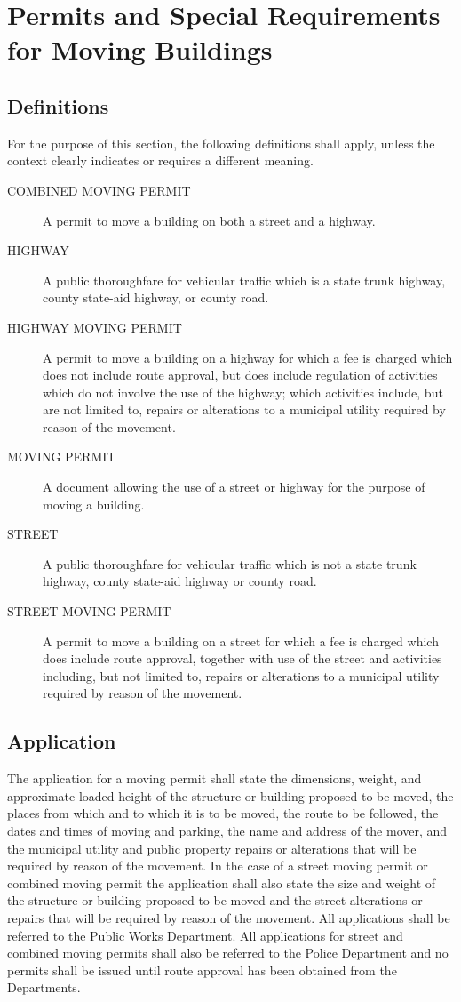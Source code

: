\section{Permits and Special Requirements for Moving Buildings}
\subsection{Definitions}
For the purpose of this section, the following definitions shall apply, unless the context clearly indicates or requires a different meaning.
\begin{description}
    \item[COMBINED MOVING PERMIT] A permit to move a building on both a street and a highway.
    \item[HIGHWAY] A public thoroughfare for vehicular traffic which is a state trunk highway, county state-aid highway, or county road.
    \item[HIGHWAY MOVING PERMIT] A permit to move a building on a highway for which a fee is charged which does not include route approval, but does include regulation of activities which do not involve the use of the highway; which activities include, but are not limited to, repairs or alterations to a municipal utility required by reason of the movement.
    \item[MOVING PERMIT] A document allowing the use of a street or highway for the purpose of moving a building.
    \item[STREET] A public thoroughfare for vehicular traffic which is not a state trunk highway, county state-aid highway or county road.
    \item[STREET MOVING PERMIT] A permit to move a building on a street for which a fee is charged which does include route approval, together with use of the street and activities including, but not limited to, repairs or alterations to a municipal utility required by reason of the movement.
\end{description}
\subsection{Application}
The application for a moving permit shall state the dimensions, weight, and approximate loaded height of the structure or building proposed to be moved, the places from which and to which it is to be moved, the route to be followed, the dates and times of moving and parking, the name and address of the mover, and the municipal utility and public property repairs or alterations that will be required by reason of the movement. In the case of a street moving permit or combined moving permit the application shall also state the size and weight of the structure or building proposed to be moved and the street alterations or repairs that will be required by reason of the movement. All applications shall be referred to the Public Works Department. All applications for street and combined moving permits shall also be referred to the Police Department and no permits shall be issued until route approval has been obtained from the Departments.
